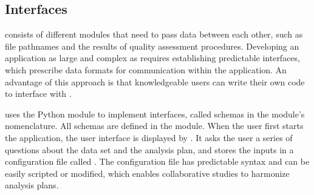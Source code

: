 \subsection{Interfaces}

 consists of different modules that need to pass data between each other, such as file pathnames and the results of quality assessment procedures. Developing an application as large and complex as  requires establishing predictable interfaces, which prescribe data formats for communication within the application. An advantage of this approach is that knowledgeable users can write their own code to interface with .

 uses the Python module  to implement interfaces, called schemas in the module's nomenclature. All schemas are defined in the  module. When the user first starts the application, the user interface is displayed by . It asks the user a series of questions about the data set and the analysis plan, and stores the inputs in a configuration file called . The configuration file has predictable syntax and can be easily scripted or modified, which enables collaborative studies to harmonize analysis plans.
